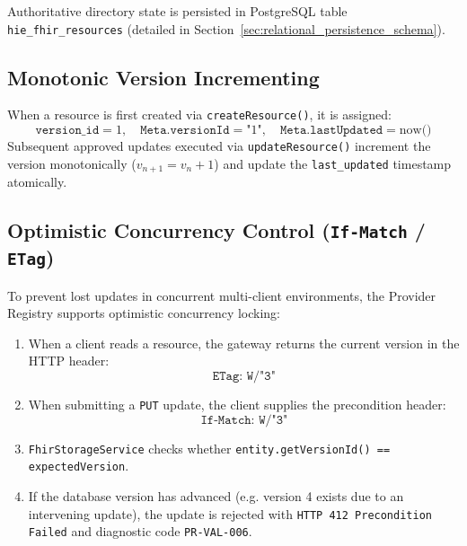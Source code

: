 Authoritative directory state is persisted in PostgreSQL table \texttt{hie\_fhir\_resources} (detailed in Section~\ref{sec:relational_persistence_schema}).

\subsection{Monotonic Version Incrementing}
When a resource is first created via \texttt{createResource()}, it is assigned:
\begin{equation}
\texttt{version\_id} = 1, \quad \texttt{Meta.versionId} = \text{"1"}, \quad \texttt{Meta.lastUpdated} = \text{now()}
\end{equation}
Subsequent approved updates executed via \texttt{updateResource()} increment the version monotonically ($v_{n+1} = v_n + 1$) and update the \texttt{last\_updated} timestamp atomically.

\subsection{Optimistic Concurrency Control (\texttt{If-Match} / \texttt{ETag})}
To prevent lost updates in concurrent multi-client environments, the Provider Registry supports optimistic concurrency locking:
\begin{enumerate}
    \item When a client reads a resource, the gateway returns the current version in the HTTP header:
    \begin{equation*}
    \texttt{ETag: W/"3"}
    \end{equation*}
    \item When submitting a \texttt{PUT} update, the client supplies the precondition header:
    \begin{equation*}
    \texttt{If-Match: W/"3"}
    \end{equation*}
    \item \texttt{FhirStorageService} checks whether \texttt{entity.getVersionId() == expectedVersion}.
    \item If the database version has advanced (e.g. version 4 exists due to an intervening update), the update is rejected with \texttt{HTTP 412 Precondition Failed} and diagnostic code \texttt{PR-VAL-006}.
\end{enumerate}

